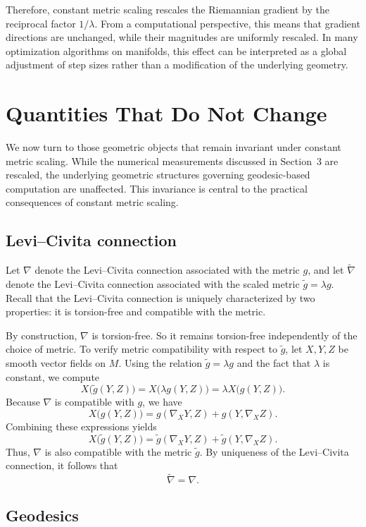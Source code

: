 \documentclass[11pt]{article}
\begin{document}
Therefore, constant metric scaling rescales the Riemannian gradient by the reciprocal
factor $1/\lambda$. From a computational perspective, this means that gradient
directions are unchanged, while their magnitudes are uniformly rescaled. In many
optimization algorithms on manifolds, this effect can be interpreted as a global
adjustment of step sizes rather than a modification of the underlying geometry.


\section{Quantities That Do Not Change}

We now turn to those geometric objects that remain invariant under constant
metric scaling. While the numerical measurements discussed in Section~3 are
rescaled, the underlying geometric structures governing geodesic-based
computation are unaffected. This invariance is central to the practical
consequences of constant metric scaling.

\subsection{Levi--Civita connection}

Let $\nabla$ denote the Levi--Civita connection associated with the metric $g$,
and let $\tilde\nabla$ denote the Levi--Civita connection associated with the
scaled metric $\tilde g = \lambda g$. Recall that the Levi--Civita connection is
uniquely characterized by two properties: it is torsion-free and compatible with
the metric.

By construction, $\nabla$ is torsion-free. So it remains torsion-free
independently of the choice of metric. To verify metric compatibility with
respect to $\tilde g$, let $X,Y,Z$ be smooth vector fields on $M$. Using the
relation $\tilde g = \lambda g$ and the fact that $\lambda$ is constant, we
compute
\[
X\bigl(\tilde g(Y,Z)\bigr)
= X\bigl(\lambda g(Y,Z)\bigr)
= \lambda X\bigl(g(Y,Z)\bigr).
\]
Because $\nabla$ is compatible with $g$, we have
\[
X\bigl(g(Y,Z)\bigr)
= g(\nabla_X Y, Z) + g(Y, \nabla_X Z).
\]
Combining these expressions yields
\[
X\bigl(\tilde g(Y,Z)\bigr)
= \tilde g(\nabla_X Y, Z) + \tilde g(Y, \nabla_X Z).
\]
Thus, $\nabla$ is also compatible with the metric $\tilde g$. By uniqueness of
the Levi--Civita connection, it follows that
\[
\tilde\nabla = \nabla.
\]

\subsection{Geodesics}
\end{document}
